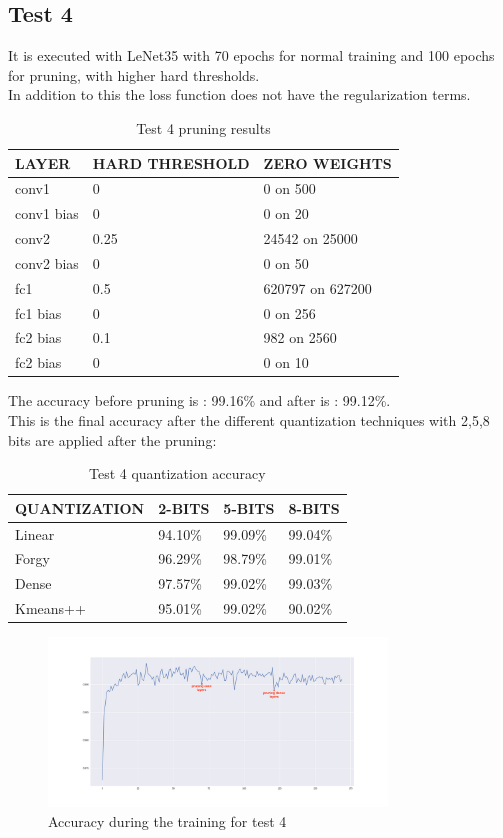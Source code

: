 \documentclass[journal]{vgtc}                %
\begin{document}
\subsection{Test 4}
It is executed with LeNet35 with 70 epochs for normal training and 100 epochs for pruning, with higher hard thresholds.\\In addition to this the loss function does not have the regularization terms.
\begin{table}[H]
\caption{Test 4 pruning results}
\label{my-label}
\begin{tabular}{|l|l|l|}
\hline
LAYER    & HARD THRESHOLD & ZERO WEIGHTS     \\ \hline
conv1      & 0         & 0 on 500 \\ \hline
conv1 bias & 0       & 0 on 20        \\ \hline
conv2      & 0.25         & 24542 on 25000   \\ \hline
conv2 bias & 0      & 0 on 50       \\ \hline
fc1      & 0.5       & 620797 on 627200      \\ \hline
fc1 bias & 0         & 0 on 256          \\ \hline
fc2 bias & 0.1         & 982 on 2560          \\ \hline
fc2 bias & 0         & 0 on 10          \\ \hline

\end{tabular}
\end{table}
The accuracy before pruning is : 99.16\% and after is : 99.12\%.\\This is the final accuracy after the different quantization techniques with 2,5,8 bits are applied after the pruning:
\begin{table}[H]
\caption{Test 4 quantization accuracy}
\label{my-label}
\begin{tabular}{|l|l|l|l|}
\hline
QUANTIZATION & 2-BITS  & 5-BITS  & 8-BITS  \\ \hline
Linear       & 94.10\% & 99.09\% & 99.04\% \\ \hline
Forgy        & 96.29\% & 98.79\% & 99.01\% \\ \hline
Dense        & 97.57\% & 99.02\% & 99.03\% \\ \hline
Kmeans++     & 95.01\% & 99.02\% & 90.02\% \\ \hline
\end{tabular}
\end{table}\begin{figure}[H]
	\hspace*{-1cm}
	\includegraphics[width=90mm,scale=0.7]{accuracy-hard-threshold-conv}
	\caption{Accuracy during the training for test 4}
\end{figure}
\end{document}
